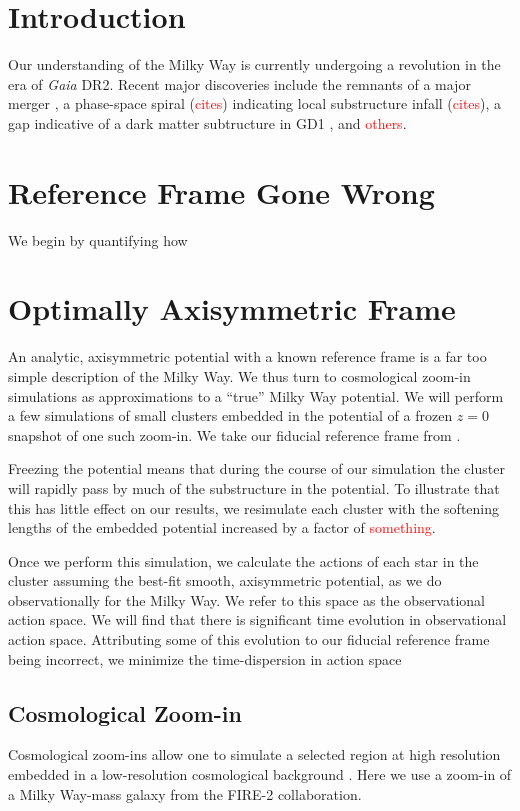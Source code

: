 \documentclass[twocolumn]{aastex62}
\newcommand{\Gus}[1]{\textcolor{red}{#1}}
\newcommand{\z}{z}
\newcommand{\gdr}{{\em Gaia} DR2}
\begin{document}

\section{Introduction} \label{sec:intro}
Our understanding of the Milky Way is currently undergoing a revolution in the era of \gdr. Recent major discoveries include the remnants of a major merger \citep{2018Natur.563...85H}, a phase-space spiral (\Gus{cites}) indicating local substructure infall (\Gus{cites}), a gap indicative of a dark matter subtructure in GD1 \citep{2018arXiv181103631B}, and \Gus{others}. 

\section{Reference Frame Gone Wrong} \label{sec:ref_frame}
We begin by quantifying how 

\section{Optimally Axisymmetric Frame} \label{sec:oa_frame}
An analytic, axisymmetric potential with a known reference frame is a far too
simple description of the Milky Way. We thus turn to cosmological zoom-in
simulations as approximations to a ``true'' Milky Way potential. We will
perform a few simulations of small clusters embedded in the potential of a
frozen $\z=0$ snapshot of one such zoom-in. We take our fiducial reference
frame from \citet{2018arXiv180610564S}.

Freezing the potential means that during the course of our simulation the
cluster will rapidly pass by much of the substructure in the potential. To
illustrate that this has little effect on our results, we resimulate each
cluster with the softening lengths of the embedded potential increased by a
factor of \Gus{something}.

Once we perform this simulation, we calculate the actions of each star in the
cluster assuming the best-fit smooth, axisymmetric potential, as we do
observationally for the Milky Way. We refer to this space as the observational action space. We will find that there is significant time evolution in observational action space. Attributing some of this evolution to our fiducial reference frame being incorrect, we minimize the time-dispersion in action space 

\subsection{Cosmological Zoom-in} \label{ssec:cosmozoom}
Cosmological zoom-ins allow one to simulate a selected region at high
resolution embedded in a low-resolution cosmological background
\citep[e.g.][]{1993ApJ...412..455K,2014MNRAS.437.1894O}. Here we use a
zoom-in of a Milky Way-mass galaxy from the FIRE-2 collaboration.
\end{document}
